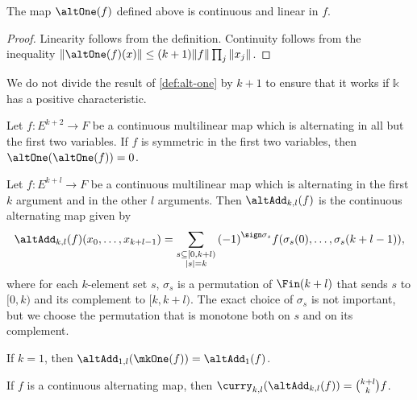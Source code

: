 \begin{lemma}%
  \label{lem:alt-one-linear}
  The map \(\altOne(f)\) defined above is continuous and linear in \(f\).
\end{lemma}
\begin{proof}
  Linearity follows from the definition.
  Continuity follows from the inequality \(\|\altOne(f)(x)\|\le (k + 1)\|f\|\prod_{j}\|x_{j}\|\).
\end{proof}

\begin{remark}
  We do not divide the result of \autoref{def:alt-one} by \(k + 1\)
  to ensure that it works if \(\mathbb k\) has a positive characteristic.
\end{remark}

\begin{theorem}%
  \label{thm:uncurry2-eq-zero}
  Let \(f\colon E^{k + 2}\to F\) be a continuous multilinear map which is alternating in all but the first two variables.
  If \(f\) is symmetric in the first two variables, then \(\altOne(\altOne(f)) = 0\).
\end{theorem}

\begin{definition}%
  \label{def:uncurry-fin-add}
  Let \(f\colon E^{k + l}\to F\) be a continuous multilinear map
  which is alternating in the first \(k\) argument and in the other \(l\) arguments.
  Then \(\altAdd_{k,l}(f)\) is the continuous alternating map given by
  \[
    \altAdd_{k,l}(f)(x_{0}, \dots, x_{k + l - 1})=\sum_{\substack{s\subseteq [0, k + l)\\|s|=k}}{(-1)}^{\sign \sigma_{s}}f(\sigma_{s}(0), \dots, \sigma_{s}(k + l - 1)),
  \]
  where for each \(k\)-element set \(s\),
  \(\sigma_{s}\) is a permutation of \(\Fin (k + l)\) that sends \(s\) to \([0, k)\) and its complement to \([k, k + l)\).
  The exact choice of \(\sigma_{s}\) is not important, but we choose the permutation that is monotone both on \(s\) and on its complement.
\end{definition}

\begin{theorem}%
  \label{thm:uncurry-fin-add-one}
  If \(k = 1\), then \(\altAdd_{1, l}(\mkOne(f)) = \altAdd_{1}(f)\).
\end{theorem}

\begin{theorem}%
  \label{thm:curry-uncurry-fin-add}
  If \(f\) is a continuous alternating map, then \(\curry_{k, l}(\altAdd_{k, l}(f)) = \binom{k + l}{k}f\).
\end{theorem}


